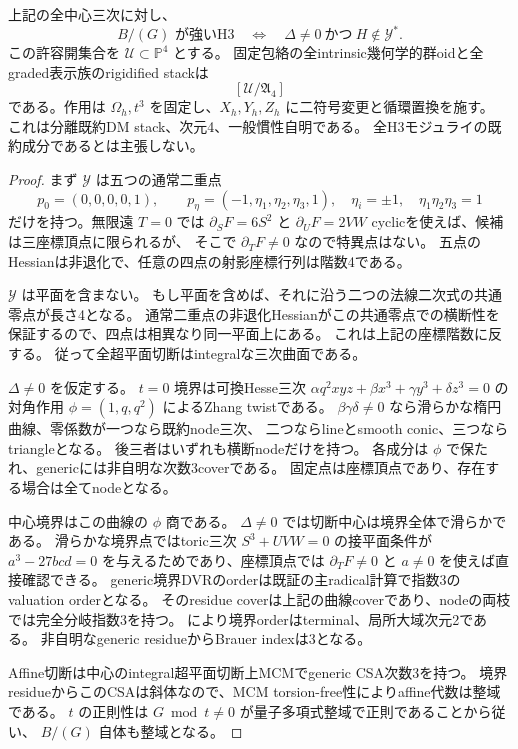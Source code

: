 \begin{theorem}
\label{thm:quantum-triangle-full-H3}
上記の全中心三次に対し、
\[
 B/(G)\text{ が強いH3}\quad\Longleftrightarrow\quad
 \Delta\ne0\ \text{かつ}\ H\notin\mathcal Y^*.
\]
この許容開集合を $\mathcal U\subset\mathbb P^4$ とする。
固定包絡の全intrinsic幾何学的群oidと全graded表示族のrigidified stackは
\[
 [\mathcal U/\mathfrak A_4]
\]
である。作用は $\Omega_h,t^3$ を固定し、$X_h,Y_h,Z_h$ に二符号変更と循環置換を施す。
これは分離既約DM stack、次元4、一般慣性自明である。
全H3モジュライの既約成分であるとは主張しない。
\end{theorem}
\begin{proof}
まず $\mathcal Y$ は五つの通常二重点
\[
 p_0=(0,0,0,0,1),\qquad
 p_{\eta}=(-1,\eta_1,\eta_2,\eta_3,1),\quad
 \eta_i=\pm1,\quad\eta_1\eta_2\eta_3=1
\]
だけを持つ。無限遠 $T=0$ では $\partial_SF=6S^2$ と
$\partial_UF=2VW$ cyclicを使えば、候補は三座標頂点に限られるが、
そこで $\partial_TF\ne0$ なので特異点はない。
五点のHessianは非退化で、任意の四点の射影座標行列は階数4である。

$\mathcal Y$ は平面を含まない。
もし平面を含めば、それに沿う二つの法線二次式の共通零点が長さ4となる。
通常二重点の非退化Hessianがこの共通零点での横断性を保証するので、四点は相異なり同一平面上にある。
これは上記の座標階数に反する。
従って全超平面切断はintegralな三次曲面である。

$\Delta\ne0$ を仮定する。
$t=0$ 境界は可換Hesse三次
$\alpha q^2xyz+\beta x^3+\gamma y^3+\delta z^3=0$
の対角作用 $\phi=(1,q,q^2)$ によるZhang twistである。
$\beta\gamma\delta\ne0$ なら滑らかな楕円曲線、零係数が一つなら既約node三次、
二つならlineとsmooth conic、三つならtriangleとなる。
後三者はいずれも横断nodeだけを持つ。
各成分は $\phi$ で保たれ、genericには非自明な次数3coverである。
固定点は座標頂点であり、存在する場合は全てnodeとなる。

中心境界はこの曲線の $\phi$ 商である。
$\Delta\ne0$ では切断中心は境界全体で滑らかである。
滑らかな境界点ではtoric三次 $S^3+UVW=0$ の接平面条件が
$a^3-27bcd=0$ を与えるためであり、座標頂点では $\partial_TF\ne0$ と
$a\ne0$ を使えば直接確認できる。
generic境界DVRのorderは既証の主radical計算で指数3のvaluation orderとなる。
そのresidue coverは上記の曲線coverであり、nodeの両枝では完全分岐指数3を持つ。
\cite[Theorems 2.7, 2.17]{CHIOrders}により境界orderはterminal、局所大域次元2である。
非自明なgeneric residueからBrauer indexは3となる。

Affine切断は中心のintegral超平面切断上MCMでgeneric CSA次数3を持つ。
境界residueからこのCSAは斜体なので、MCM torsion-free性によりaffine代数は整域である。
$t$ の正則性は $G\bmod t\ne0$ が量子多項式整域で正則であることから従い、
$B/(G)$ 自体も整域となる。


\end{proof}

